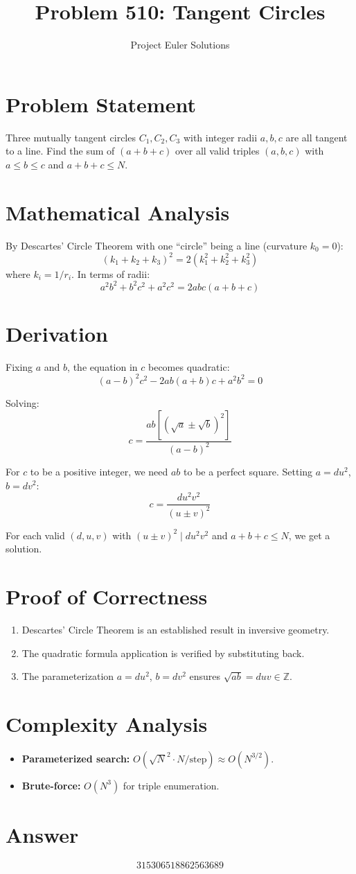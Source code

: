 \documentclass[11pt]{article}
\title{Problem 510: Tangent Circles}
\author{Project Euler Solutions}
\date{}
\begin{document}
\maketitle

\section{Problem Statement}
Three mutually tangent circles $C_1, C_2, C_3$ with integer radii $a, b, c$ are all tangent to a line. Find the sum of $(a+b+c)$ over all valid triples $(a,b,c)$ with $a \leq b \leq c$ and $a+b+c \leq N$.

\section{Mathematical Analysis}
By Descartes' Circle Theorem with one ``circle'' being a line (curvature $k_0 = 0$):
\[
(k_1 + k_2 + k_3)^2 = 2(k_1^2 + k_2^2 + k_3^2)
\]
where $k_i = 1/r_i$. In terms of radii:
\[
a^2b^2 + b^2c^2 + a^2c^2 = 2abc(a + b + c)
\]

\section{Derivation}
Fixing $a$ and $b$, the equation in $c$ becomes quadratic:
\[
(a-b)^2 c^2 - 2ab(a+b)c + a^2b^2 = 0
\]

Solving:
\[
c = \frac{ab\left[(\sqrt{a} \pm \sqrt{b})^2\right]}{(a-b)^2}
\]

For $c$ to be a positive integer, we need $ab$ to be a perfect square. Setting $a = du^2$, $b = dv^2$:
\[
c = \frac{du^2v^2}{(u \pm v)^2}
\]

For each valid $(d, u, v)$ with $(u \pm v)^2 \mid du^2v^2$ and $a + b + c \leq N$, we get a solution.

\section{Proof of Correctness}
\begin{enumerate}
    \item Descartes' Circle Theorem is an established result in inversive geometry.
    \item The quadratic formula application is verified by substituting back.
    \item The parameterization $a = du^2$, $b = dv^2$ ensures $\sqrt{ab} = duv \in \mathbb{Z}$.
\end{enumerate}

\section{Complexity Analysis}
\begin{itemize}
    \item \textbf{Parameterized search:} $O(\sqrt{N}^2 \cdot N/\text{step}) \approx O(N^{3/2})$.
    \item \textbf{Brute-force:} $O(N^3)$ for triple enumeration.
\end{itemize}

\section{Answer}

\[
\boxed{315306518862563689}
\]
\end{document}
